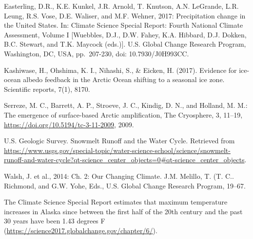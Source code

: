 \documentclass[12pt,]{article}
\begin{document}
Easterling, D.R., K.E. Kunkel, J.R. Arnold, T. Knutson, A.N. LeGrande,
L.R. Leung, R.S. Vose, D.E. Waliser, and M.F. Wehner, 2017:
Precipitation change in the United States. In: Climate Science Special
Report: Fourth National Climate Assessment, Volume I {[}Wuebbles, D.J.,
D.W. Fahey, K.A. Hibbard, D.J. Dokken, B.C. Stewart, and T.K. Maycock
(eds.){]}. U.S. Global Change Research Program, Washington, DC, USA,
pp.~207-230, doi: 10.7930/J0H993CC.

Kashiwase, H., Ohshima, K. I., Nihashi, S., \& Eicken, H. (2017).
Evidence for ice-ocean albedo feedback in the Arctic Ocean shifting to a
seasonal ice zone. Scientific reports, 7(1), 8170.

Serreze, M. C., Barrett, A. P., Stroeve, J. C., Kindig, D. N., and
Holland, M. M.: The emergence of surface-based Arctic amplification, The
Cryosphere, 3, 11--19, \url{https://doi.org/10.5194/tc-3-11-2009}, 2009.

U.S. Geologic Survey. Snowmelt Runoff and the Water Cycle. Retrieved
from
\url{https://www.usgs.gov/special-topic/water-science-school/science/snowmelt-runoff-and-water-cycle?qt-science_center_objects=0\#qt-science_center_objects}.

Walsh, J. et al., 2014: Ch. 2: Our Changing Climate. J.M. Melillo, T.
(T. C.. Richmond, and G.W. Yohe, Eds., U.S. Global Change Research
Program, 19--67.

The Climate Science Special Report estimates that maximum temperature
increases in Alaska since between the first half of the 20th century and
the past 30 years have been 1.43 degrees F
(\url{https://science2017.globalchange.gov/chapter/6/}).
\end{document}
